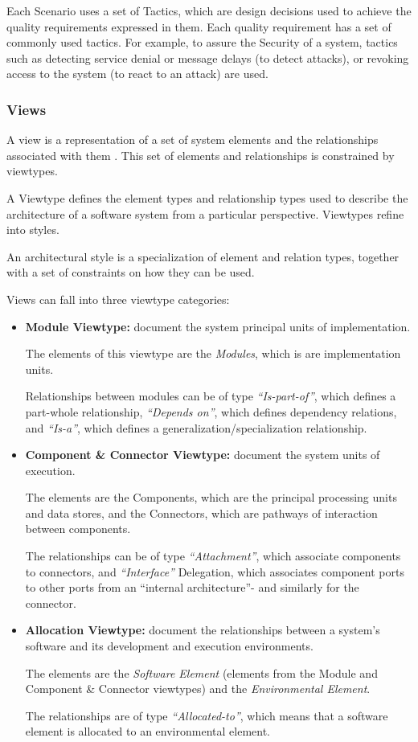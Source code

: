 Each Scenario uses a set of Tactics, which are design decisions used to achieve the quality requirements expressed in them. Each quality requirement has a set of commonly used tactics. For example, to assure the Security of a system, tactics such as detecting service denial or message delays (to detect attacks), or revoking access to the system (to react to an attack) are used.

\subsubsection{Views}
\label{subsection:domainModelViews}
A view is a representation of a set of system elements and the relationships associated with them \cite{clements2003documenting}. This set of elements and relationships is constrained by viewtypes.

A Viewtype defines the element types and relationship types used to describe the architecture of a software system from a particular perspective. Viewtypes refine into styles.

An architectural style is a specialization of element and relation types, together with a set of constraints on how they can be used.

Views can fall into three viewtype categories:
\begin{itemize}
\item \textbf{Module Viewtype:} document the system principal units of implementation. 

The elements of this viewtype are the \textit{Modules}, which is are implementation units. 

Relationships between modules can be of type \textit{``Is-part-of''}, which defines a part-whole relationship, \textit{``Depends on''}, which defines dependency relations, and \textit{``Is-a''}, which defines a generalization/specialization relationship.

\item \textbf{Component \& Connector Viewtype:} document the system units of execution. 

The elements are the Components, which are the principal processing units and data stores, and the Connectors, which are pathways of interaction between components. 

The relationships can be of type \textit{``Attachment''}, which associate components to connectors, and \textit{``Interface''} Delegation, which associates component ports to other ports from an ``internal architecture''- and similarly for the connector.

\item \textbf{Allocation Viewtype:} document the relationships between a system's software and its development and execution environments. 

The elements are the \textit{Software Element} (elements from the Module and Component \& Connector viewtypes) and the \textit{Environmental Element}. 

The relationships are of type \textit{``Allocated-to''}, which means that a software element is allocated to an environmental element. 
\end{itemize}

